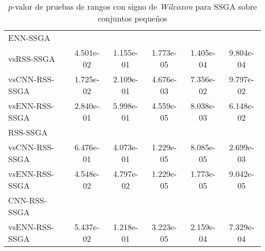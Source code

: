 \begin{table}[h!]
\begin{adjustbox}{max width =\textwidth}
\begin{tabular}{l c c c c c}
\hline

ENN-SSGA\\
vsRSS-SSGA & 4.501e-02 & 1.155e-01 & 1.773e-05 & 1.405e-04 & 9.804e-04 \\
vsCNN-RSS-SSGA & 1.725e-02 & 2.109e-01 & 4.676e-03 & 7.356e-02 & 9.797e-02 \\
vsENN-RSS-SSGA & 2.840e-01 & 5.998e-01 & 4.559e-05 & 8.038e-03 & 6.148e-02 \\ 

\hline

RSS-SSGA\\
vsCNN-RSS-SSGA & 6.476e-01 & 4.073e-01 & 1.229e-05 & 8.085e-05 & 2.699e-03 \\
vsENN-RSS-SSGA  & 4.548e-02 & 4.797e-02 & 1.229e-05 & 1.773e-05 & 9.042e-05 \\ 

\hline

CNN-RSS-SSGA\\
vsENN-RSS-SSGA & 5.437e-02 & 1.218e-01 & 3.223e-05 & 2.159e-04 & 7.329e-04 \\

\hline 

\end{tabular}
\end{adjustbox}
\caption[Pruebas de \emph{Wilcoxon} entre SSGA y variaciones para conjuntos pequeños]{$p$-valor de pruebas de rangos con signo de \emph{Wilcoxon} para SSGA sobre conjuntos pequeños}
\label{wilcox-SSGA-peq}
\end{table}

